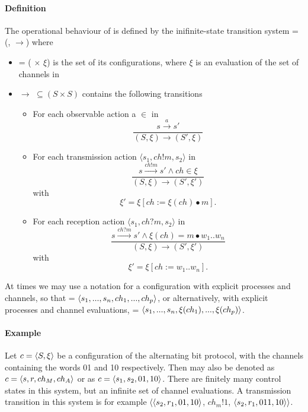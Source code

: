 \paragraph{Definition}
\label{CTS}
The operational behaviour of  is defined by the inifinite-state transition system  = (, $\rightarrow$) where
\begin{itemize}
\item[]
    = ( $\times$ $\xi$) is the set of its configurations, where $\xi$ is an evaluation of the set of channels  in 
\item[]
  $\rightarrow$ $\subseteq (S \times S)$ contains the following transitions
  \begin{itemize}
    \item
      For each observable action a $\in$  in 
      \[
      \dfrac{s \xrightarrow{a} s'}{(S, \xi) \rightarrow (S', \xi)}
      \]
    \item
      For each transmission action $\langle s_1, ch!m, s_2 \rangle$ in 
      \[
      \dfrac{s \xrightarrow{ch!m} s' \wedge ch \in \xi}{(S, \xi) \rightarrow (S', \xi')} \] with \[ \xi' = \xi[ch := \xi (ch) \bullet m].
      \]
    \item
      For each reception action $\langle s_1, ch?m, s_2 \rangle$ in 
      \[
      \dfrac{s \xrightarrow{ch?m} s' \wedge \xi(ch) = m \bullet w_1..w_n}{(S, \xi) \rightarrow (S', \xi')} \] with \[ \xi' = \xi[ch:= w_1..w_n].
      \]

  \end{itemize}
\end{itemize}

At times we may use a notation for a configuration  with explicit processes and channels, so that  = $\langle s_1,...,s_n, ch_1,...,ch_p\rangle$, or alternatively, with explicit processes and channel evaluations,  = $\langle s_1,...,s_n, \xi(ch_1),...,\xi(ch_p)\rangle$.

\paragraph{Example}
Let $c = \langle S,\xi\rangle$ be a configuration of the alternating bit protocol, with the channels containing the words 01 and 10 respectively. Then  may also be denoted as $c = \langle s,r,ch_M,ch_A\rangle$ or as $c = \langle s_1,s_2,01,10\rangle$. There are finitely many control states in this system, but an infinite set of channel evaluations. A transmission transition in this system is for example $\langle\langle s_2,r_1,01,10\rangle$, $ch_m!1$, $\langle s_2,r_1,011,10\rangle\rangle$. 


